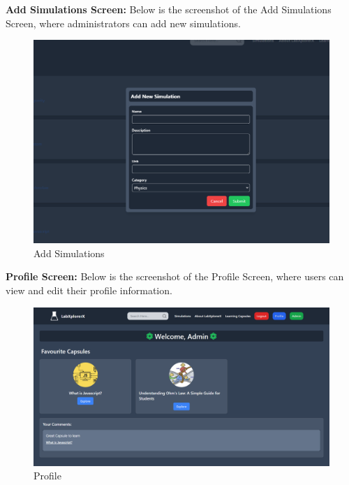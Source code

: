 \textbf{Add Simulations Screen:} Below is the screenshot of the Add Simulations Screen, where administrators can add new simulations.
\begin{figure}[H]
    \centering
    \includegraphics[width = 15cm]{Diagrams/output/addsimulations.png}
    \caption{Add Simulations}
\end{figure}

\textbf{Profile Screen:} Below is the screenshot of the Profile Screen, where users can view and edit their profile information.
\begin{figure}[H]
    \centering
    \includegraphics[width = 15cm]{Diagrams/output/profile.png}
    \caption{Profile}
\end{figure}

